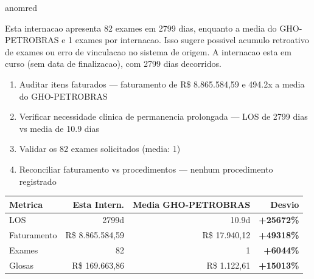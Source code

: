 \documentclass[a4paper,10pt]{article}
\begin{document}
\begin{anomalycard}[Internacao 93 | GHO-PETROBRAS | CRITICO (z=5.03)]{anomred}
\vspace{2pt}\begin{tcolorbox}[colback=severityred!20,colframe=anomred,title={\textbf{Interpretacao de Negocio}},fonttitle=\bfseries\small,left=4pt,right=4pt,top=3pt,bottom=3pt]
{\small Esta internacao apresenta 82 exames em 2799 dias, enquanto a media do GHO-PETROBRAS e 1 exames por internacao. Isso sugere possivel acumulo retroativo de exames ou erro de vinculacao no sistema de origem. A internacao esta em curso (sem data de finalizacao), com 2799 dias decorridos.}
\end{tcolorbox}
\begin{tcolorbox}[colback=severityyellow!30,colframe=anomorange,title={\textbf{Recomendacoes Especificas}},fonttitle=\bfseries\small,left=4pt,right=4pt,top=3pt,bottom=3pt]
\begin{enumerate}[nosep,leftmargin=16pt]
\item {\small Auditar itens faturados --- faturamento de R\$ 8.865.584,59 e 494.2x a media do GHO-PETROBRAS}
\item {\small Verificar necessidade clinica de permanencia prolongada --- LOS de 2799 dias vs media de 10.9 dias}
\item {\small Validar os 82 exames solicitados (media: 1)}
\item {\small Reconciliar faturamento vs procedimentos --- nenhum procedimento registrado}
\end{enumerate}
\end{tcolorbox}
\begin{center}\begin{tabular}{l r r r}\toprule\textbf{Metrica} & \textbf{Esta Intern.} & \textbf{Media GHO-PETROBRAS} & \textbf{Desvio} \\\midrule
LOS & 2799d & 10.9d & \textcolor{anomred}{\textbf{+25672\%}} \\
Faturamento & R\$ 8.865.584,59 & R\$ 17.940,12 & \textcolor{anomred}{\textbf{+49318\%}} \\
Exames & 82 & 1 & \textcolor{anomred}{\textbf{+6044\%}} \\
Glosas & R\$ 169.663,86 & R\$ 1.122,61 & \textcolor{anomred}{\textbf{+15013\%}} \\
\bottomrule\end{tabular}\end{center}


\end{anomalycard}
\end{document}
